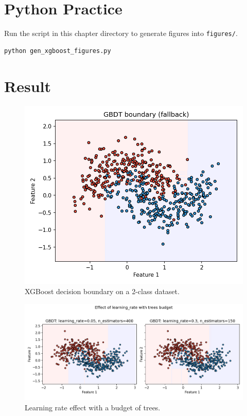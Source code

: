 \documentclass[11pt]{article}
\begin{document}
\section{Python Practice}
Run the script in this chapter directory to generate figures into \texttt{figures/}.
\begin{lstlisting}[style=code,caption={Generate XGBoost figures},label={lst:genfigs_xgb}]
python gen_xgboost_figures.py
\end{lstlisting}



\section{Result}
\begin{figure}[H]
  \centering
  \includegraphics[width=0.9\linewidth]{xgb_decision_boundary_2class.png}
  \caption{XGBoost decision boundary on a 2-class dataset.}
  \label{fig:xgb2}
\end{figure}
\FloatBarrier

\begin{figure}[H]
  \centering
  \includegraphics[width=0.95\linewidth]{xgb_learning_rate_compare.png}
  \caption{Learning rate effect with a budget of trees.}
  \label{fig:xgb_lr}
\end{figure}
\FloatBarrier
\end{document}
